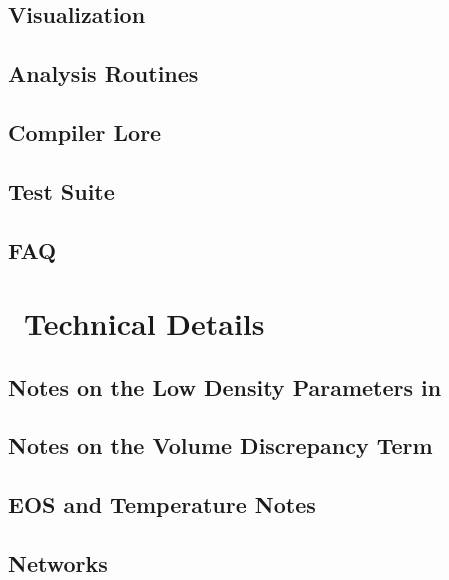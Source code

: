 \documentclass[11pt]{book}    %
\begin{document}
\chapter{Visualization}


\chapter{Analysis Routines}


\chapter{Compiler Lore}


\chapter{Test Suite}


\chapter{FAQ}


\part{\maestro\ Technical Details}

\chapter{Notes on the Low Density Parameters in \maestro}


\chapter{Notes on the Volume Discrepancy Term}


\chapter{EOS and Temperature Notes}


\chapter{Networks}

\end{document}
